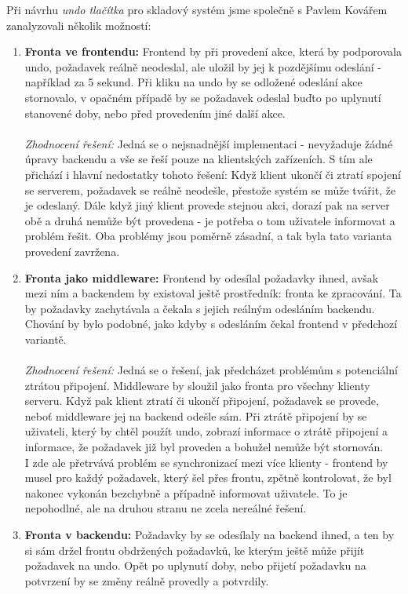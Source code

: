 Při návrhu \emph{undo tlačítka} pro skladový systém jsme společně s Pavlem Kovářem zanalyzovali několik možností:
\begin{enumerate}
	\item \textbf{Fronta ve frontendu:} Frontend by při provedení akce, která by podporovala undo, požadavek reálně neodeslal, ale uložil by jej k pozdějšímu odeslání - například za 5 sekund. Při kliku na undo by se odložené odeslání akce stornovalo, v opačném případě by se požadavek odeslal buďto po uplynutí stanovené doby, nebo před provedením jiné další akce.\\\\
	\emph{Zhodnocení řešení:} Jedná se o nejsnadnější implementaci - nevyžaduje žádné úpravy backendu a vše se řeší pouze na klientských zařízeních. S tím ale přichází i hlavní nedostatky tohoto řešení: Když klient ukončí či ztratí spojení se serverem, požadavek se reálně neodešle, přestože systém se může tvářit, že je odeslaný. Dále když jiný klient provede stejnou akci, dorazí pak na server obě a druhá nemůže být provedena - je potřeba o tom uživatele informovat a problém řešit. Oba problémy jsou poměrně zásadní, a tak byla tato varianta provedení zavržena.
	\item \textbf{Fronta jako middleware:} Frontend by odesílal požadavky ihned, avšak mezi ním a backendem by existoval ještě prostředník: fronta ke zpracování. Ta by požadavky zachytávala a čekala s jejich reálným odesláním backendu. Chování by bylo podobné, jako kdyby s odesláním čekal frontend v předchozí variantě.\\\\
	\emph{Zhodnocení řešení:} Jedná se o řešení, jak předcházet problémům s potenciální ztrátou připojení. Middleware by sloužil jako fronta pro všechny klienty serveru. Když pak klient ztratí či ukončí připojení, požadavek se provede, neboť middleware jej na backend odešle sám. Při ztrátě připojení by se uživateli, který by chtěl použít undo, zobrazí informace o ztrátě připojení a informace, že požadavek již byl proveden a bohužel nemůže být stornován.\\
	I zde ale přetrvává problém se synchronizací mezi více klienty - frontend by musel pro každý požadavek, který šel přes frontu, zpětně kontrolovat, že byl nakonec vykonán bezchybně a případně informovat uživatele. To je nepohodlné, ale na druhou stranu ne zcela nereálné řešení.
	\item \textbf{Fronta v backendu:} Požadavky by se odesílaly na backend ihned, a ten by si sám držel frontu obdržených požadavků, ke kterým ještě může přijít požadavek na undo. Opět po uplynutí doby, nebo přijetí požadavku na potvrzení by se změny reálně provedly a potvrdily.\\\\

\end{enumerate}
